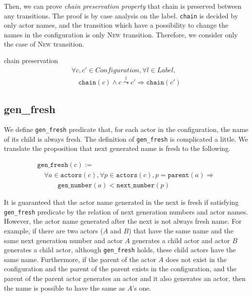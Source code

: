 Then, we can prove \textit{chain preservation property} that chain is preserved between any transitions.
The proof is by case analysis on the label.
\texttt{chain} is decided by only actor names, and the transition which have a possibility to change the names in the configuration is only \textsc{New} transition.
Therefore, we consider only the case of \textsc{New} transition.

\begin{lemma}{chain preservation}
\begin{displaymath}
  \begin{array}{l}
    \forall c, c' \in \textit{Configuration}, \forall l \in \textit{Label}, \\
    \quad \texttt{chain}(c) \wedge c \overset{l}{\leadsto} c' \Rightarrow \texttt{chain}(c')
  \end{array}
\end{displaymath}
\end{lemma}

\subsection{gen\_fresh}
We define \texttt{gen\_fresh} predicate that, for each actor in the configuration, the name of its child is always fresh.
The definition of \texttt{gen\_fresh} is complicated a little.
We translate the proposition that next generated name is fresh to the following.

\begin{displaymath}
  \begin{array}{l}
    \texttt{gen\_fresh}(c) := \\
    \quad \forall a \in \texttt{actors}(c), \forall p \in \texttt{actors}(c), p = \texttt{parent}(a) \Rightarrow \\
    \quad \quad \quad \texttt{gen\_number}(a) < \texttt{next\_number}(p)
  \end{array}
\end{displaymath}


It is guaranteed that the actor name generated in the next is fresh if satisfying \texttt{gen\_fresh} predicate by the relation of next generation numbers and actor names. %
However, the actor name generated after the next is not always fresh name.
For example, if there are two actors ($A$ and $B$) that have the same name and the same next generation number and actor $A$ generates a child actor and actor $B$ generates a child actor, although \texttt{gen\_fresh} holds, these child actors have the same name.
Furthermore, if the parent of the actor $A$ does not exist in the configuration and the parent of the parent exists in the configuration, and the parent of the parent actor generates an actor and it also generates an actor, then the name is possible to have the same as $A$'s one.

